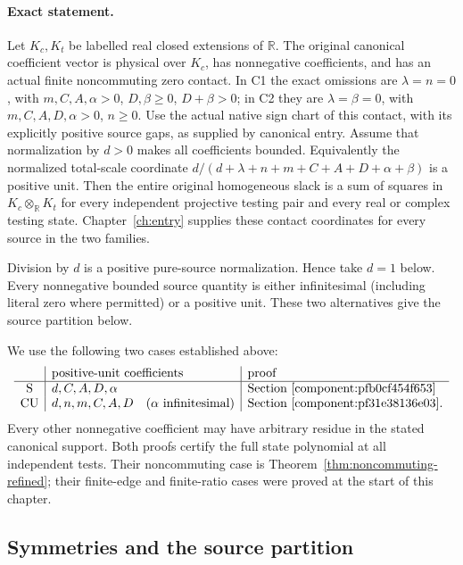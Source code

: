 \paragraph{Exact statement.}
Let \(K_c,K_t\) be labelled real closed extensions of \(\mathbb R\).
The original canonical coefficient vector is physical over \(K_c\),
has nonnegative coefficients, and has an actual finite noncommuting
zero contact. In C1 the exact omissions are \(\lambda=n=0\),
with \(m,C,A,\alpha>0\), \(D,\beta\geq0\), \(D+\beta>0\);
in C2 they are \(\lambda=\beta=0\), with
\(m,C,A,D,\alpha>0\), \(n\geq0\).
Use the actual native sign chart of this contact, with its explicitly
positive source gaps, as supplied by canonical entry.
Assume that normalization by \(d>0\) makes all coefficients bounded.
Equivalently the normalized total-scale coordinate
\(d/(d+\lambda+n+m+C+A+D+\alpha+\beta)\) is a positive unit.
Then the entire original homogeneous slack is a sum of squares
in \(K_c\otimes_{\mathbb R}K_t\) for every independent projective
testing pair and every real or complex testing state.
Chapter~\ref{ch:entry} supplies these contact coordinates for every
source in the two families.

Division by \(d\) is a positive pure-source normalization.
Hence take \(d=1\) below. Every nonnegative bounded source quantity
is either infinitesimal (including literal zero where permitted)
or a positive unit. These two alternatives give the source partition below.

We use the following two cases established above:
\[
\begin{array}{c|l|l}
 &\text{positive-unit coefficients}&\text{proof}\\\hline
\mathrm S&d,C,A,D,\alpha&\text{Section~\ref{component:pfb0cf454f653}}\\
\mathrm{CU}&d,n,m,C,A,D\quad(\alpha\text{ infinitesimal})
 &\text{Section~\ref{component:pf31e38136e03}}.
\end{array}
\]
Every other nonnegative coefficient may have arbitrary residue in
the stated canonical support. Both proofs certify the full state
polynomial at all independent tests. Their noncommuting case is
Theorem~\ref{thm:noncommuting-refined}; their finite-edge and
finite-ratio cases were proved at the start of this chapter.


\subsection*{Symmetries and the source partition}

